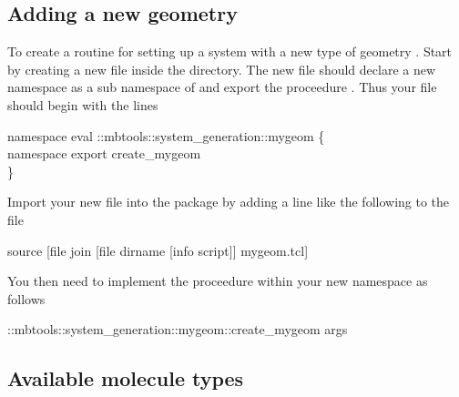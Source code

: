 \subsection{Adding a new geometry}

To create a routine for setting up a system with a new type of geometry . Start by creating a new file   inside the  directory. The new file should declare a new namespace  as a sub namespace of  and export the proceedure . Thus your  file should begin with the lines

\begin{code}
  namespace eval ::mbtools::system\_generation::mygeom \{\\
    namespace export create_mygeom\\
  \}\\
\end{code}  

Import your new file into the  package by adding a line like the following to the  file

\begin{code}
  source [file join [file dirname [info script]] mygeom.tcl]
\end{code}


You then need to implement the  proceedure within your new namespace as follows
\begin{code}
  ::mbtools::system_generation::mygeom::create_mygeom { args }
\end{code}



\subsection{Available molecule types}


